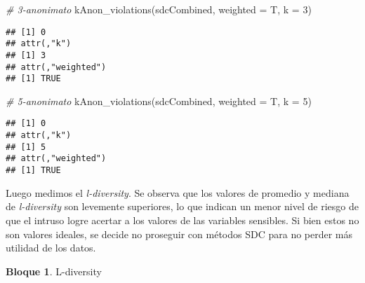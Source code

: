 \documentclass[
]{book}
\newenvironment{Shaded}{\begin{snugshade}}{\end{snugshade}}
\newcommand{\AttributeTok}[1]{\textcolor[rgb]{0.77,0.63,0.00}{#1}}
\newcommand{\CommentTok}[1]{\textcolor[rgb]{0.56,0.35,0.01}{\textit{#1}}}
\newcommand{\ConstantTok}[1]{\textcolor[rgb]{0.00,0.00,0.00}{#1}}
\newcommand{\DecValTok}[1]{\textcolor[rgb]{0.00,0.00,0.81}{#1}}
\newcommand{\FunctionTok}[1]{\textcolor[rgb]{0.00,0.00,0.00}{#1}}
\newcommand{\NormalTok}[1]{#1}
\newcommand{\OtherTok}[1]{\textcolor[rgb]{0.56,0.35,0.01}{#1}}
\newcommand{\SpecialCharTok}[1]{\textcolor[rgb]{0.00,0.00,0.00}{#1}}
\theoremstyle{definition}
\theoremstyle{definition}
\newtheorem{example}{Bloque}[chapter]
\theoremstyle{definition}
\theoremstyle{definition}
\theoremstyle{remark}
\begin{document}
\begin{Shaded}
\begin{Highlighting}[]
\CommentTok{\# 3{-}anonimato}
\FunctionTok{kAnon\_violations}\NormalTok{(sdcCombined, }\AttributeTok{weighted =}\NormalTok{ T, }\AttributeTok{k =} \DecValTok{3}\NormalTok{) }
\end{Highlighting}
\end{Shaded}

\begin{verbatim}
## [1] 0
## attr(,"k")
## [1] 3
## attr(,"weighted")
## [1] TRUE
\end{verbatim}

\begin{Shaded}
\begin{Highlighting}[]
\CommentTok{\# 5{-}anonimato}
\FunctionTok{kAnon\_violations}\NormalTok{(sdcCombined, }\AttributeTok{weighted =}\NormalTok{ T, }\AttributeTok{k =} \DecValTok{5}\NormalTok{) }
\end{Highlighting}
\end{Shaded}

\begin{verbatim}
## [1] 0
## attr(,"k")
## [1] 5
## attr(,"weighted")
## [1] TRUE
\end{verbatim}

Luego medimos el \emph{l-diversity}. Se observa que los valores de promedio y mediana de \emph{l-diversity} son levemente superiores, lo que indican un menor nivel de riesgo de que el intruso logre acertar a los valores de las variables sensibles. Si bien estos no son valores ideales, se decide no proseguir con métodos SDC para no perder más utilidad de los datos.

\begin{example}
\protect\hypertarget{exm:bloque69nbm}{}\label{exm:bloque69nbm}L-diversity
\end{example}

\begin{Shaded}
\end{Shaded}
\end{document}
